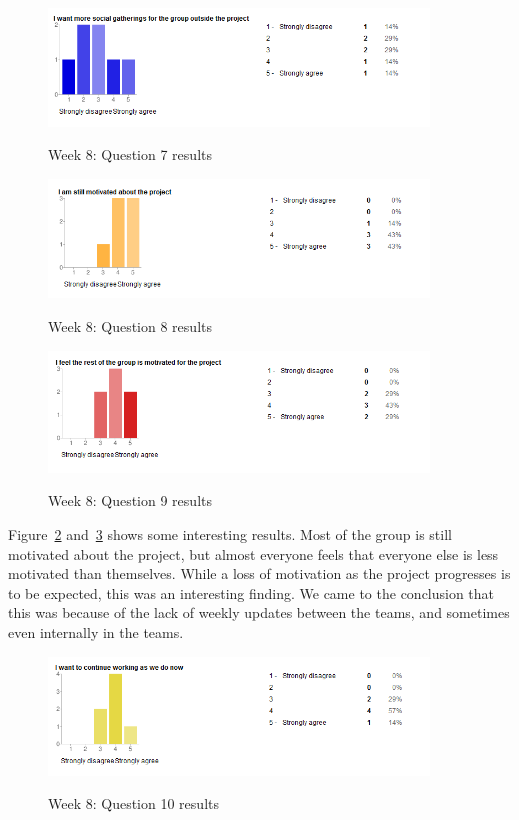 \begin{figure}[th!]
\caption{Week 8: Question 7 results}
\centering
\includegraphics[width=0.9\textwidth]{evaluation/week_8_images/social}
\label{fig:W8Q7}
\end{figure}

\begin{figure}[th!]
\caption{Week 8: Question 8 results}
\centering
\includegraphics[width=0.9\textwidth]{evaluation/week_8_images/i_motivated}
\label{fig:W8Q8}
\end{figure}

\begin{figure}[th!]
\caption{Week 8: Question 9 results}
\centering
\includegraphics[width=0.9\textwidth]{evaluation/week_8_images/them_motivated}
\label{fig:W8Q9}
\end{figure}

Figure~\ref{fig:W8Q8} and~\ref{fig:W8Q9} shows some interesting results. Most of the group is still motivated about the project, but almost everyone feels that everyone else is less motivated than themselves. While a loss of motivation as the project progresses is to be expected, this was an interesting finding. We came to the conclusion that this was because of the lack of weekly updates between the teams, and sometimes even internally in the teams.

\begin{figure}[th!]
\caption{Week 8: Question 10 results}
\centering
\includegraphics[width=0.9\textwidth]{evaluation/week_8_images/continue_work}
\label{fig:W8Q10}
\end{figure}


